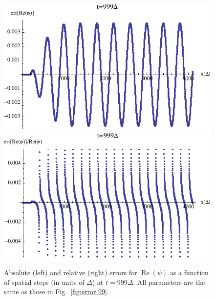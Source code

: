 \documentclass[12pt,letter,onecolumn,notitlepage]{article}
\DeclareMathOperator{\re}{Re}
\begin{document}
\begin{figure}[htbp]%
	\centering
	\includegraphics[scale=0.6]{abs_error_t_999}
	\includegraphics[scale=0.6]{rel_error_t_999}
	\caption{Absolute (left) and relative (right) errors for $\re(\psi)$ as a function of spatial steps (in units of $\Delta$) at $t=999\Delta$. All parameters are the same as those in Fig.~\ref{fig:error 99}.}
	\label{fig:error 999}
\end{figure}
\end{document}
